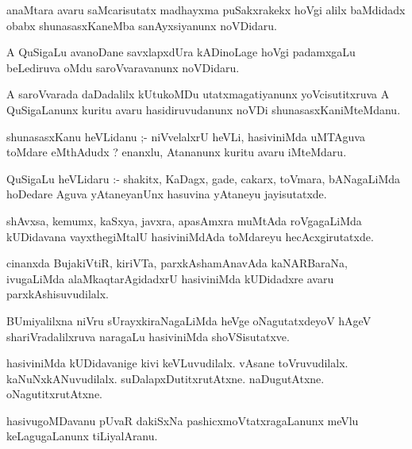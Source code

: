 \documentclass{article}
\begin{document}
\begin{mn}
anaMtara  avaru  saMcarisutatx  madhayxma  puSakxrakekx  hoVgi  alilx  baMdidadx   obabx  shunasasxKaneMba  
sanAyxsiyanunx  noVDidaru.
\end{mn}

\begin{mn}
A QuSigaLu  avanoDane  savxlapxdUra  kADinoLage  hoVgi  padamxgaLu beLediruva  oMdu  saroVvaravanunx  noVDidaru.
\end{mn}

\begin{mn}
A  saroVvarada  daDadalilx  kUtukoMDu  utatxmagatiyanunx  yoVcisutitxruva  A  QuSigaLanunx  
kuritu  avaru  hasidiruvudanunx  noVDi  shunasasxKaniMteMdanu.
\end{mn}

\begin{mn}
shunasasxKanu  heVLidanu ;- niVvelalxrU  heVLi,  hasiviniMda  uMTAguva  toMdare  eMthAdudx ?  
enanxlu,  Atananunx  kuritu  avaru  iMteMdaru.
\end{mn}

\begin{mn}
QuSigaLu  heVLidaru :- shakitx,  KaDagx,  gade,  cakarx,  toVmara, bANagaLiMda  hoDedare  Aguva  
yAtaneyanUnx  hasuvina  yAtaneyu  jayisutatxde.
\end{mn}

\begin{mn}
shAvxsa,  kemumx,  kaSxya,  javxra,  apasAmxra  muMtAda  roVgagaLiMda  kUDidavana  
vayxthegiMtalU  hasiviniMdAda  toMdareyu  hecAcxgirutatxde.
\end{mn}

\begin{mn}
cinanxda  BujakiVtiR,  kiriVTa,  parxkAshamAnavAda  kaNARBaraNa,  ivugaLiMda  
alaMkaqtarAgidadxrU  hasiviniMda  kUDidadxre  avaru  parxkAshisuvudilalx.
\end{mn}

\begin{mn}
BUmiyalilxna  niVru  sUrayxkiraNagaLiMda  heVge  oNagutatxdeyoV  hAgeV  shariVradalilxruva  
naragaLu  hasiviniMda  shoVSisutatxve. 
\end{mn}

\begin{mn}
hasiviniMda  kUDidavanige  kivi  keVLuvudilalx.  vAsane  toVruvudilalx.  kaNuNxkANuvudilalx.  
suDalapxDutitxrutAtxne.  naDugutAtxne.  oNagutitxrutAtxne.
\end{mn}

\begin{mn}
hasivugoMDavanu  pUvaR  dakiSxNa  pashicxmoVtatxragaLanunx  meVlu  keLagugaLanunx  tiLiyalAranu. 
\end{mn}
\end{document}
